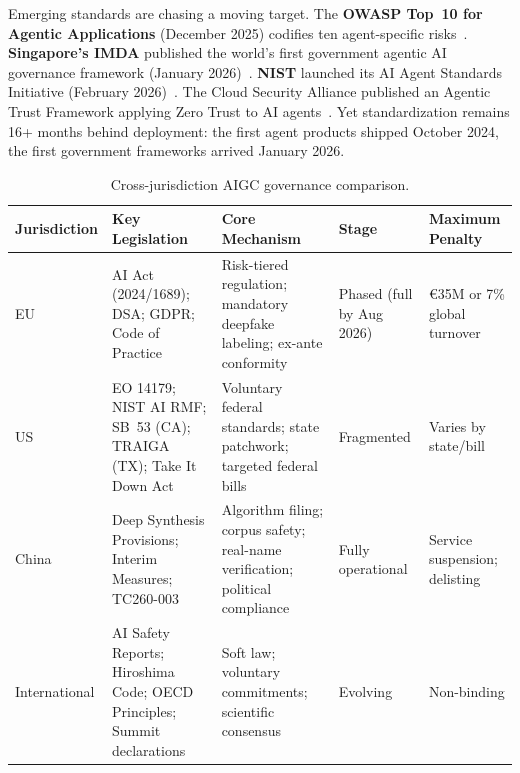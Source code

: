 Emerging standards are chasing a moving target. The \textbf{OWASP Top~10 for Agentic Applications} (December 2025) codifies ten agent-specific risks~\cite{owasp2025agentic}. \textbf{Singapore's IMDA} published the world's first government agentic AI governance framework (January 2026)~\cite{imda2026agentic}. \textbf{NIST} launched its AI Agent Standards Initiative (February 2026)~\cite{nist2026agentstandards}. The Cloud Security Alliance published an Agentic Trust Framework applying Zero Trust to AI agents~\cite{csa2026agentic}. Yet standardization remains 16+ months behind deployment: the first agent products shipped October 2024, the first government frameworks arrived January 2026.

\begin{table}[htbp]
\centering
\caption{Cross-jurisdiction AIGC governance comparison.}
\label{tab:governance}
\small
\begin{tabular}{p{1.8cm}p{3.2cm}p{2.8cm}p{2.0cm}p{2.8cm}}
\toprule
\textbf{Jurisdiction} & \textbf{Key Legislation} & \textbf{Core Mechanism} & \textbf{Stage} & \textbf{Maximum Penalty} \\
\midrule
EU &
AI Act (2024/1689); DSA; GDPR; Code of Practice &
Risk-tiered regulation; mandatory deepfake labeling; ex-ante conformity &
Phased (full by Aug 2026) &
\euro35M or 7\% global turnover \\
\addlinespace
US &
EO 14179; NIST AI RMF; SB~53 (CA); TRAIGA (TX); Take It Down Act &
Voluntary federal standards; state patchwork; targeted federal bills &
Fragmented &
Varies by state/bill \\
\addlinespace
China &
Deep Synthesis Provisions; Interim Measures; TC260-003 &
Algorithm filing; corpus safety; real-name verification; political compliance &
Fully operational &
Service suspension; delisting \\
\addlinespace
International &
AI Safety Reports; Hiroshima Code; OECD Principles; Summit declarations &
Soft law; voluntary commitments; scientific consensus &
Evolving &
Non-binding \\
\bottomrule
\end{tabular}
\end{table}
